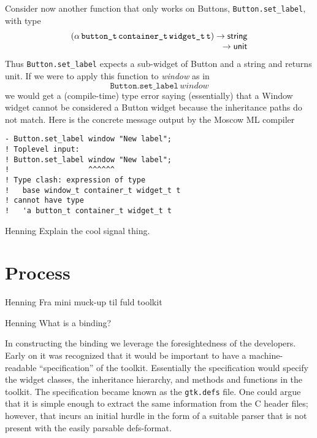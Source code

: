 \documentclass[workingdraft,endnotes]{usetex-v1}
\begin{document}
Consider now another function that only works on Buttons, \texttt{Button.set\_label}, with type
\begin{displaymath}\begin{array}{l}
(\tApp{\tApp{\tApp{\tApp{\alpha}{\tWitness{button}}}{\tWitness{container}}}{\tWitness{widget}}}{\tName{t}})
\rightarrow
\tString
\\
\multicolumn{1}{r}{\rightarrow\tUnit}
\end{array}\end{displaymath}
Thus \texttt{Button.set\_label} expects a sub-widget of Button and a string and returns unit.
If we were to apply this function to \textit{window} as in
\begin{displaymath}
\texttt{Button.set\_label}\,\textit{window}
\end{displaymath}
we would get a (compile-time) type error saying (essentially) that
a Window widget cannot be considered a Button widget because the
inheritance paths do not match. Here is the concrete message output
by the Moscow ML compiler
\begin{verbatim}
- Button.set_label window "New label";
! Toplevel input:
! Button.set_label window "New label";
!                  ^^^^^^
! Type clash: expression of type
!   base window_t container_t widget_t t
! cannot have type
!   'a button_t container_t widget_t t
\end{verbatim}

\begin{ednote}{Henning}
  Explain the cool signal thing.
\end{ednote}

\section{Process}
\label{sec:process}

\begin{ednote}{Henning}
  Fra mini muck-up til fuld toolkit
\end{ednote}

\begin{ednote}{Henning}
  What is a binding?
\end{ednote}

In constructing the \mgtk binding we leverage the foresightedness of
the \gtk developers. Early on it was recognized that it would be
important to have a machine-readable ``specification'' of the toolkit.
Essentially the specification would specify the widget classes, the
inheritance hierarchy, and methods and functions in the toolkit. The
specification became known as the \texttt{gtk.defs} file. One could
argue that it is simple enough to extract the same information from
the C header files; however, that incurs an initial hurdle in the
form of a suitable parser that is not present with the easily parsable
defs-format.
\end{document}
